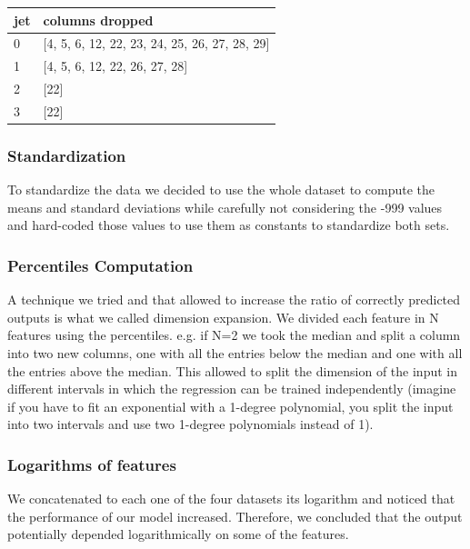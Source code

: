 \documentclass[10pt,conference,compsocconf]{IEEEtran}
\begin{document}
\vspace{1em}
\begin{tabular}{l|l}
\hline
 jet  & columns dropped \\
\hline
0 & [4, 5, 6, 12, 22, 23, 24, 25, 26, 27, 28, 29] \\
1 & [4, 5, 6, 12, 22, 26, 27, 28] \\
2 & [22]  \\
3 & [22]\\
\hline
\end{tabular}
\vspace{1em}




\subsubsection{Standardization}
To standardize the data we decided to use the whole dataset to compute the means and standard deviations while carefully not considering the -999 values and hard-coded those values to use them as constants to standardize both sets.

\subsubsection{Percentiles Computation}
A technique we tried and that allowed to increase the ratio of correctly predicted outputs is what we called dimension expansion. We divided each feature in N features using the percentiles. e.g. if N=2 we took the median and split a column into two new columns, one with all the entries below the median and one with all the entries above the median. This allowed to split the dimension of the input in different intervals in which the regression can be trained independently (imagine if you have to fit an exponential with a 1-degree polynomial, you split the input into two intervals and use two 1-degree polynomials instead of 1).  
\subsubsection{Logarithms of features}
We concatenated to each one of the four datasets its logarithm and noticed that the performance of our model increased. Therefore, we concluded that the output potentially depended logarithmically on some of the features.
\end{document}
